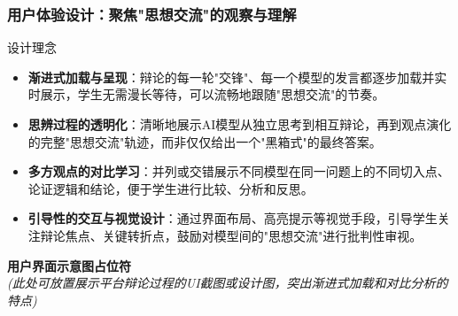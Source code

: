 \documentclass[aspectratio=169]{beamer} %
\begin{document}
\begin{frame}[shrink=15]
\frametitle{用户体验设计：聚焦"思想交流"的观察与理解}
\begin{block}{设计理念}
\begin{itemize}
    \item \textbf{渐进式加载与呈现}：辩论的每一轮"交锋"、每一个模型的发言都逐步加载并实时展示，学生无需漫长等待，可以流畅地跟随"思想交流"的节奏。
    \item \textbf{思辨过程的透明化}：清晰地展示AI模型从独立思考到相互辩论，再到观点演化的完整"思想交流"轨迹，而非仅仅给出一个"黑箱式"的最终答案。
    \item \textbf{多方观点的对比学习}：并列或交错展示不同模型在同一问题上的不同切入点、论证逻辑和结论，便于学生进行比较、分析和反思。
    \item \textbf{引导性的交互与视觉设计}：通过界面布局、高亮提示等视觉手段，引导学生关注辩论焦点、关键转折点，鼓励对模型间的"思想交流"进行批判性审视。
\end{itemize}
\end{block}
\begin{center}
    \vspace{0.5cm}
    \textbf{用户界面示意图占位符}\\
    \textit{(此处可放置展示平台辩论过程的UI截图或设计图，突出渐进式加载和对比分析的特点)}
\end{center}
\end{frame}
\end{document}
